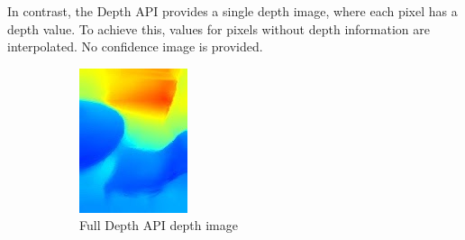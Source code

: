 In contrast, the Depth API provides a single depth image, where each pixel has a depth value.
To achieve this, values for pixels without depth information are interpolated.
No confidence image is provided.

\begin{figure}[ht!]
    \centering
    \begin{subfigure}[b]{0.4\textwidth}
        \centering
        \includegraphics[width=0.8\linewidth]{images/depth_full-depth-image}
        \caption{Full Depth API depth image}
    \end{subfigure}%
    \begin{subfigure}[b]{0.4\textwidth}
        \centering

\end{subfigure}
\end{figure}
